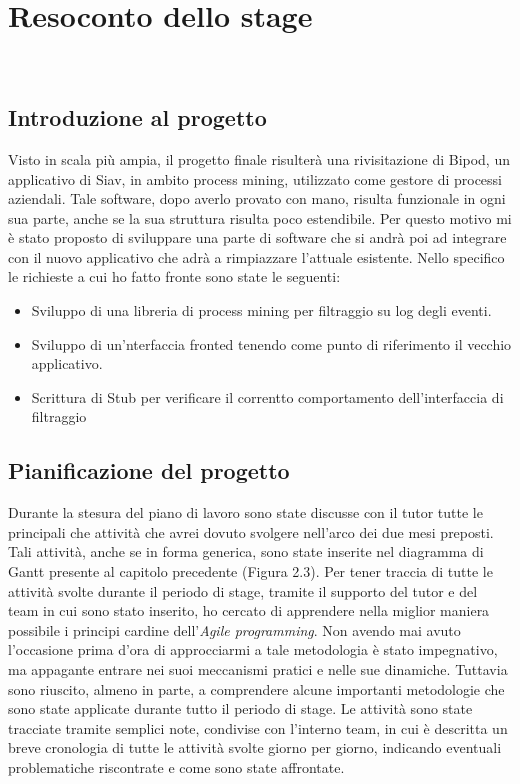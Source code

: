 
\chapter{Resoconto dello stage}
\label{cap:descrizione-stage}

\\

\section{Introduzione al progetto}
Visto in scala più ampia, il progetto finale risulterà una rivisitazione di Bipod, un applicativo di Siav, in ambito process mining, utilizzato come gestore di processi aziendali.
Tale software, dopo averlo provato con mano, risulta funzionale in ogni sua parte, anche se la sua struttura risulta poco estendibile. Per questo motivo mi è stato proposto di sviluppare una parte di software che si andrà poi ad integrare con il nuovo applicativo che adrà a rimpiazzare l'attuale esistente.
Nello specifico le richieste a cui ho fatto fronte sono state le seguenti:
\begin{itemize}
	\item Sviluppo di una libreria di process mining per filtraggio su log degli eventi.
	\item Sviluppo di un'nterfaccia fronted tenendo come punto di riferimento il vecchio applicativo.
	\item Scrittura di Stub per verificare il correntto comportamento dell'interfaccia di filtraggio
\end{itemize}
\section{Pianificazione del progetto}
Durante la stesura del piano di lavoro sono state discusse con il tutor tutte le principali che attività che avrei dovuto svolgere nell'arco dei due mesi preposti. Tali attività, anche se in forma generica, sono state inserite nel diagramma di Gantt presente al capitolo precedente (Figura 2.3).
Per tener traccia di tutte le attività svolte durante il periodo di stage, tramite il supporto del tutor e del team in cui sono stato inserito, ho cercato di apprendere nella miglior maniera possibile i principi cardine dell'\textit{Agile programming}. Non avendo mai avuto l'occasione prima d'ora di approcciarmi a tale metodologia è stato impegnativo, ma appagante entrare nei suoi meccanismi pratici e nelle sue dinamiche. Tuttavia sono riuscito, almeno in parte, a comprendere alcune importanti metodologie che sono state applicate durante tutto il periodo di stage. Le attività sono state tracciate tramite semplici note, condivise con l'interno team, in cui è descritta un breve cronologia di tutte le attività svolte giorno per giorno, indicando eventuali problematiche riscontrate e come sono state affrontate.

